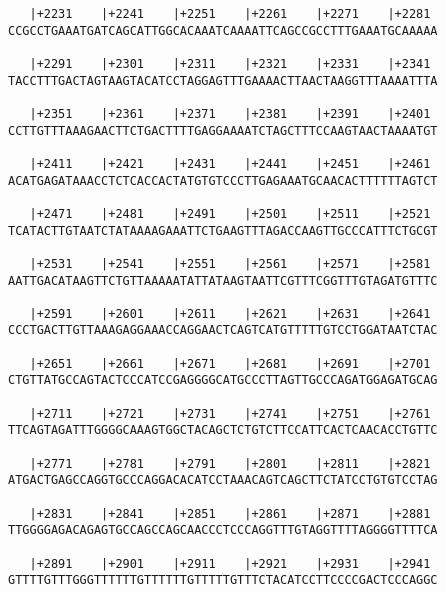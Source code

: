 \documentclass{article}
\begin{document}
\begin{Verbatim}
   |+2231    |+2241    |+2251    |+2261    |+2271    |+2281 
CCGCCTGAAATGATCAGCATTGGCACAAATCAAAATTCAGCCGCCTTTGAAATGCAAAAA
                                                            
   |+2291    |+2301    |+2311    |+2321    |+2331    |+2341 
TACCTTTGACTAGTAAGTACATCCTAGGAGTTTGAAAACTTAACTAAGGTTTAAAATTTA
                                                            
   |+2351    |+2361    |+2371    |+2381    |+2391    |+2401 
CCTTGTTTAAAGAACTTCTGACTTTTGAGGAAAATCTAGCTTTCCAAGTAACTAAAATGT
                                                            
   |+2411    |+2421    |+2431    |+2441    |+2451    |+2461 
ACATGAGATAAACCTCTCACCACTATGTGTCCCTTGAGAAATGCAACACTTTTTTAGTCT
                                                            
   |+2471    |+2481    |+2491    |+2501    |+2511    |+2521 
TCATACTTGTAATCTATAAAAGAAATTCTGAAGTTTAGACCAAGTTGCCCATTTCTGCGT
                                                            
   |+2531    |+2541    |+2551    |+2561    |+2571    |+2581 
AATTGACATAAGTTCTGTTAAAAATATTATAAGTAATTCGTTTCGGTTTGTAGATGTTTC
                                                            
   |+2591    |+2601    |+2611    |+2621    |+2631    |+2641 
CCCTGACTTGTTAAAGAGGAAACCAGGAACTCAGTCATGTTTTTGTCCTGGATAATCTAC
                                                            
   |+2651    |+2661    |+2671    |+2681    |+2691    |+2701 
CTGTTATGCCAGTACTCCCATCCGAGGGGCATGCCCTTAGTTGCCCAGATGGAGATGCAG
                                                            
   |+2711    |+2721    |+2731    |+2741    |+2751    |+2761 
TTCAGTAGATTTGGGGCAAAGTGGCTACAGCTCTGTCTTCCATTCACTCAACACCTGTTC
                                                            
   |+2771    |+2781    |+2791    |+2801    |+2811    |+2821 
ATGACTGAGCCAGGTGCCCAGGACACATCCTAAACAGTCAGCTTCTATCCTGTGTCCTAG
                                                            
   |+2831    |+2841    |+2851    |+2861    |+2871    |+2881 
TTGGGGAGACAGAGTGCCAGCCAGCAACCCTCCCAGGTTTGTAGGTTTTAGGGGTTTTCA
                                                            
   |+2891    |+2901    |+2911    |+2921    |+2931    |+2941 
GTTTTGTTTGGGTTTTTTGTTTTTTGTTTTTGTTTCTACATCCTTCCCCGACTCCCAGGC
                                                            

\end{Verbatim}
\end{document}

